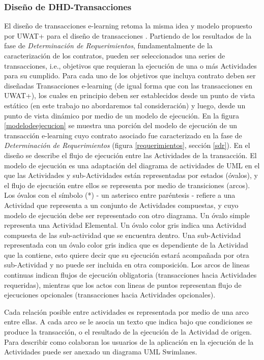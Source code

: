 \subsubsection{Diseño de DHD-Transacciones}

El diseño de transacciones e-learning retoma la misma idea y modelo propuesto
por UWAT+ para el diseño de transacciones \cite{UWAT}. Partiendo de los
resultados de la fase de \textit{Determinación de Requerimientos},
fundamentalmente de la caracterización de los contratos, pueden ser
seleccionados una series de transacciones, i.e., objetivos que requieran la
ejecución de una o más Actividades para su cumplido. Para cada uno de los
objetivos que incluya contrato deben ser diseñadas Transacciones e-learning (de
igual forma que con las transacciones en UWAT+), los cuales en principio deben
ser establecidos desde un punto de vista estático (en este trabajo no
abordaremos tal consideración) y luego, desde un punto de vista dinámico por
medio de un modelo de ejecución. En la figura \ref{modelodeejecucion} se muestra
una porción del modelo de ejecución de un transacción e-learning cuyo contrato
asociado fue caracterizado en la fase de \textit{Determinación de
Requerimientos} (figura \ref{requerimientos}, sección \ref{sdr}). En el diseño
se describe el flujo de ejecución entre las Actividades de la transacción. El
modelo de ejecución es una adaptación del diagrama de actividades de UML
\cite{7} en el que las Actividades y sub-Actividades están representadas por
estados (óvalos), y el flujo de ejecución entre ellos se representa por medio de
transiciones (arcos). Los óvalos con el símbolo (*) - un asterisco entre
paréntesis - refiere a una Actividad que representa a un conjunto de Actividades
compuestas, y cuyo modelo de ejecución debe ser representado con otro diagrama.
Un óvalo simple representa una Actividad Elemental. Un óvalo color gris indica
una Actividad compuesta de las sub-actividad que se encuentra dentro. Una
sub-Actividad representada con un óvalo color gris indica que es dependiente de
la Actividad que la contiene, esto quiere decir que su ejecución estará
acompañada por otra sub-Actividad y no puede ser incluida en otra composición.
Los arcos de lineas continuas indican flujos de ejecución obligatoria
(transacciones hacia Actividades requeridas), mientras que los actos con lineas
de puntos representan flujo de ejecuciones opcionales  (transacciones hacia
Actividades opcionales).
 
Cada relación posible entre actividades es representada por medio de una arco
entre ellas. A cada arco se le asocia un texto que indica bajo que condiciones
se produce la transacción, o el resultado de la ejecución de la Actividad de
origen. Para describir como colaboran los usuarios de la aplicación en la
ejecución de la Actividades puede ser anexado un diagrama UML Swimlanes. 

